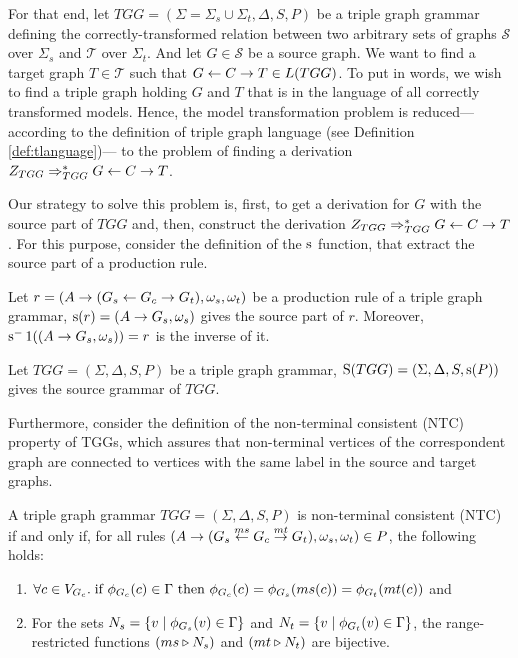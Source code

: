 \documentclass[runningheads]{llncs}
\begin{document}
For that end, let $TGG = (\Sigma = \Sigma_s \cup \Sigma_t, \Delta, S, P)$ be a triple graph grammar defining the correctly-transformed relation between two arbitrary sets of graphs $\mathcal{S}$ over $\Sigma_s$ and $\mathcal{T}$ over $\Sigma_t$. And let $G \in \mathcal{S}$ be a source graph. We want to find a target graph $T \in \mathcal{T}$ such that $G \ms{} C \mt{} T \in L(TGG)$. To put in words, we wish to find a triple graph holding $G$ and $T$ that is in the language of all correctly transformed models. Hence, the model transformation problem is reduced--- according to the definition of triple graph language (see Definition \ref{def:tlanguage})--- to the problem of finding a derivation $\startTG{TGG} \tderivtr{TGG} G \ms{} C \mt{} T$.

Our strategy to solve this problem is, first, to get a derivation for $G$ with the source part of $TGG$ and, then, construct the derivation $\startTG{TGG} \tderivtr{TGG} G \ms{} C \mt{} T$. For this purpose, consider the definition of the $\source$ function, that extract the source part of a production rule.

\begin{definition}
	\label{def:source}
	Let $r = (A \pro (G_s \ms{} G_c \mt{} G_t), \omega_s, \omega_t)$ be a production rule of a triple graph grammar, $\source(r) = (A \pro G_s,\omega_s)$ gives the source part of $r$. Moreover, $\source^-1((A \pro G_s,\omega_s)) = r$ is the inverse of it.
\end{definition}

\begin{definition}
	\label{def:Source}
	Let $TGG = (\Sigma, \Delta, S, P)$ be a triple graph grammar, $\Source(TGG) = (\Sigma, \Delta, S, \source(P))$ gives the source grammar of $TGG$.
\end{definition}

Furthermore, consider the definition of the non-terminal consistent (NTC) property of TGGs, which assures that non-terminal vertices of the correspondent graph are connected to vertices with the same label in the source and target graphs.

\begin{definition}
	A triple graph grammar $TGG = (\Sigma, \Delta, S, P)$ is non-terminal consistent (NTC) if and only if, for all rules $(A \pro (G_s \ms{ms} G_c \mt{mt} G_t), \omega_s, \omega_t) \in P$, the following holds:
	\begin{enumerate}
		\item $\forall c \in V_{G_c} \. \text{if } \phi_{G_c}(c) \in \Gamma \text{ then } \phi_{G_c}(c) = \phi_{G_s}(ms(c)) = \phi_{G_t}(mt(c))$ and
		\item For the sets $N_s = \{v \st \phi_{G_s}(v) \in \Gamma\}$ and $N_t = \{v \st \phi_{G_t}(v) \in \Gamma\}$, the range-restricted functions $(ms \rrestr N_s)$ and $(mt \rrestr N_t)$ are bijective.
	\end{enumerate}
\end{definition}
\end{document}
